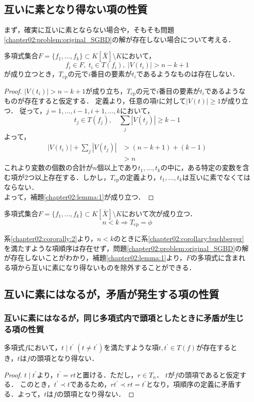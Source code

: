 \subsection{互いに素となり得ない項の性質}
まず，確実に互いに素とならない場合や，そもそも問題\ref{chapter02:problem:original_SGBD}の解が存在しない場合について考える．
\begin{lemma}
	\label{chapter02:lemma:1}
	多項式集合$F=\{ f_1, \dots, f_k \} \subset K[\bar{X}]\setminus K$において，
	$$f_i \in F, \; t_i \in T(f_i), \; |V(t_i)| > n - k + 1$$
	が成り立つとき，$T_{\mathrm{cp}}$の元で$i$番目の要素が$t_i$であるようなものは存在しない．
\end{lemma}
\begin{proof}
	$|V(t_i)| > n - k + 1$が成り立ち，$T_{\mathrm{cp}}$の元で$i$番目の要素が$t_i$であるようなものが存在すると仮定する．
	定義より，任意の項$t$に対して$|V(t)| \ge 1$が成り立つ．
	従って，$j = 1, \dots, i-1, i+1, \dots, k$において，
	$$t_j \in T(f_j), \quad \sum_j |V(t_j)| \ge k -1$$
	よって，
	\begin{align*}
		|V(t_i)| + \sum_j|V(t_j)| &> (n - k + 1) + (k - 1)\\
		& > n
	\end{align*}
	これより変数の個数の合計が$n$個以上であり$t_1, \dots, t_k$の中に，ある特定の変数を含む項が$2$つ以上存在する．しかし，$T_{\mathrm{cp}}$の定義より，$t_1,\dots, t_k$は互いに素でなくてはならない．\\
	よって，補題\ref{chapter02:lemma:1}が成り立つ．
\end{proof}
\begin{corollary}
	\label{chapter02:cororally:2}
	多項式集合$F=\{ f_1, \dots, f_k \} \subset K[\bar{X}]\setminus K$において次が成り立つ．
	$$n<k \Longrightarrow T_{\mathrm{cp}}= \phi$$
\end{corollary}
系\ref{chapter02:cororally:2}より，$n<k$のときに系\ref{chapter02:corollary:buchberger}を満たすような項順序は存在せず，問題\ref{chapter02:problem:original_SGBD}の解が存在しないことがわかり，補題\ref{chapter02:lemma:1}より，$F$の多項式に含まれる項から互いに素になり得ないものを除外することができる．
\subsection{互いに素にはなるが，矛盾が発生する項の性質}
\subsubsection{互いに素にはなるが，同じ多項式内で頭項としたときに矛盾が生じる項の性質}
\begin{lemma}
	\label{chapter02:lemma:3}
	多項式$f$において，$t \mid t^\prime\; (t \ne t^\prime)$を満たすような項$t, t^\prime \in T(f)$が存在するとき，$t$は$f$の頭項となり得ない．
\end{lemma}
\begin{proof}
	$t \mid t^\prime$より，$t^\prime = rt$と置ける．ただし，$r\in T_n$．
	$t$が$f$の頭項であると仮定する．
	このとき，$t^\prime \prec t$であるため，$rt^\prime \prec rt = t^\prime$となり，項順序の定義に矛盾する．よって，$t$は$f$の頭項となり得ない．
\end{proof}

